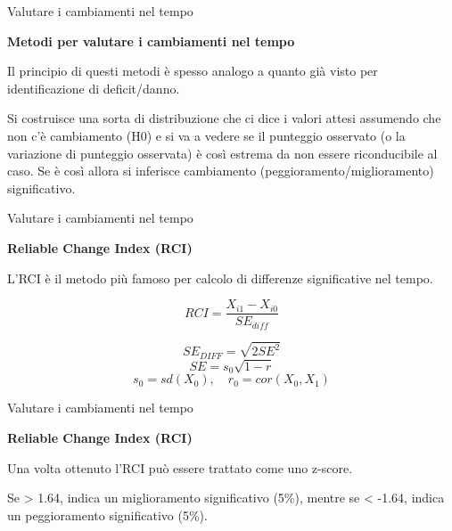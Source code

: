 \documentclass[
  ignorenonframetext,
]{beamer}
\begin{document}
\begin{frame}{Valutare i cambiamenti nel tempo}
\label{valutare-i-cambiamenti-nel-tempo-8}
\begin{center}
  \textbf{Metodi per valutare i cambiamenti nel tempo}
\end{center}
\vspace{1em}

Il principio di questi metodi è spesso analogo a quanto già visto per
identificazione di deficit/danno.

Si costruisce una sorta di distribuzione che ci dice i valori attesi
assumendo che non c'è cambiamento (H0) e si va a vedere se il punteggio
osservato (o la variazione di punteggio osservata) è così estrema da non
essere riconducibile al caso. Se è così allora si inferisce cambiamento
(peggioramento/miglioramento) significativo.
\end{frame}

\begin{frame}{Valutare i cambiamenti nel tempo}
\label{valutare-i-cambiamenti-nel-tempo-9}
\begin{center}
\textbf{Reliable Change Index (RCI)}
\end{center}
\vspace{2em}

L'RCI è il metodo più famoso per calcolo di differenze significative nel
tempo.

\[
  RCI = \frac{X_{i1} -X_{i0}}{SE_{diff}}
\]

\small

\[ SE_{DIFF} = \sqrt{2SE^2} \] \[SE = s_0\sqrt{1-r} \]
\[s_0 = sd(X_0), \quad r_0 = cor(X_0,X_1)\]
\end{frame}

\begin{frame}{Valutare i cambiamenti nel tempo}
\label{valutare-i-cambiamenti-nel-tempo-10}
\begin{center}
\textbf{Reliable Change Index (RCI)}
\end{center}
\vspace{2em}

Una volta ottenuto l'RCI può essere trattato come uno z-score.

Se \textgreater{} 1.64, indica un miglioramento significativo (5\%),
mentre se \textless{} -1.64, indica un peggioramento significativo
(5\%).
\end{frame}
\end{document}
